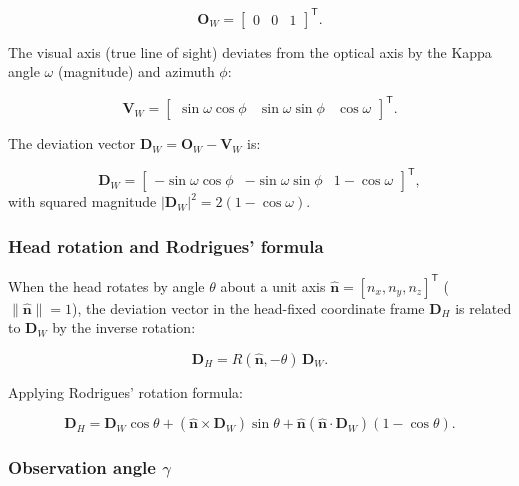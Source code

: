 \documentclass[review,numbers,sort&compress]{elsarticle}
\begin{document}
\begin{equation}
\mathbf{O}_W = \begin{bmatrix} 0 & 0 & 1 \end{bmatrix}^{\mathsf{T}}.
\end{equation}

The visual axis (true line of sight) deviates from the optical axis by the Kappa angle $\omega$ (magnitude) and azimuth $\phi$:

\begin{equation}
\mathbf{V}_W = \begin{bmatrix} \sin\omega\cos\phi & \sin\omega\sin\phi & \cos\omega \end{bmatrix}^{\mathsf{T}}.
\end{equation}

The deviation vector $\mathbf{D}_W = \mathbf{O}_W - \mathbf{V}_W$ is:

\begin{equation}
\mathbf{D}_W = \begin{bmatrix} -\sin\omega\cos\phi & -\sin\omega\sin\phi & 1-\cos\omega \end{bmatrix}^{\mathsf{T}},
\end{equation}
with squared magnitude $|\mathbf{D}_W|^2 = 2(1-\cos\omega)$.

\subsubsection{Head rotation and Rodrigues' formula}

When the head rotates by angle $\theta$ about a unit axis $\hat{\mathbf{n}} = [n_x, n_y, n_z]^{\mathsf{T}}$ ($\|\hat{\mathbf{n}}\|=1$), the deviation vector in the head-fixed coordinate frame $\mathbf{D}_H$ is related to $\mathbf{D}_W$ by the inverse rotation:

\begin{equation}
\mathbf{D}_H = R(\hat{\mathbf{n}}, -\theta)\,\mathbf{D}_W.
\end{equation}

Applying Rodrigues' rotation formula:

\begin{equation}
\mathbf{D}_H = \mathbf{D}_W\cos\theta + (\hat{\mathbf{n}}\times\mathbf{D}_W)\sin\theta + \hat{\mathbf{n}}(\hat{\mathbf{n}}\cdot\mathbf{D}_W)(1-\cos\theta).
\label{eq:rodrigues}
\end{equation}

\subsubsection{Observation angle $\gamma$}
\end{document}
